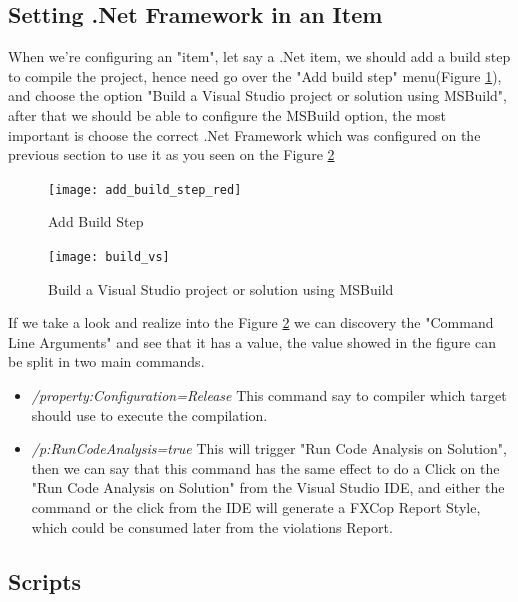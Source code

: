 \documentclass[12pt]{article} %
\begin{document}

\subsection{Setting .Net Framework in an Item} %

 When we're configuring an "item", let say a .Net item, we should add a build step to compile the project, hence need go over the "Add build step" menu(Figure \ref{fig:add_build_step_red}), and choose the option "Build a Visual Studio project or solution using MSBuild", after that we should be able to configure the MSBuild option, the most important is choose the correct .Net Framework which was configured on the previous section to use it as you seen on the Figure \ref{fig:build_vs}
 
 \begin{figure}[H] %
 	\center
	{\texttt{[image: add\_build\_step\_red]}}
	\caption{Add Build Step}
	\label{fig:add_build_step_red}
\end{figure}

 \begin{figure}[H] %
 	\center
	{\texttt{[image: build\_vs]}}
	\caption{Build a Visual Studio project or solution using MSBuild}
	\label{fig:build_vs}
\end{figure}

If we take a look and realize into the Figure \ref{fig:build_vs} we can discovery the "Command Line Arguments" and see that it has a value, the value showed in the figure can be split in two main commands.

\begin{itemize}
	\item \textit{/property:Configuration=Release} This command say to compiler which target should use to execute the compilation.
	\item \textit{/p:RunCodeAnalysis=true} This will trigger "Run Code Analysis on Solution", then we can say that this command has the same effect to do a Click on the "Run Code Analysis on Solution" from the Visual Studio IDE, and either the command or the click from the IDE will generate a FXCop Report Style, which could be consumed later from the violations Report.
\end{itemize}

\subsection{Scripts} %
\end{document}
